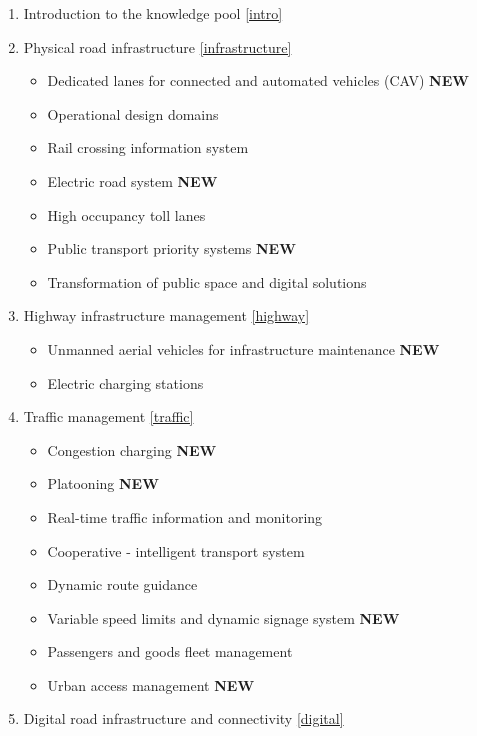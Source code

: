 \documentclass[
]{book}
\providecommand{\tightlist}{%
  \setlength{\itemsep}{0pt}\setlength{\parskip}{0pt}}
\begin{document}
\begin{enumerate}
\def\labelenumi{\arabic{enumi}.}
\tightlist
\item
  Introduction to the knowledge pool \ref{intro}
\item
  Physical road infrastructure \ref{infrastructure}

  \begin{itemize}
  \tightlist
  \item
    Dedicated lanes for connected and automated vehicles (CAV) \textbf{NEW}
  \item
    Operational design domains
  \item
    Rail crossing information system
  \item
    Electric road system \textbf{NEW}
  \item
    High occupancy toll lanes
  \item
    Public transport priority systems \textbf{NEW}
  \item
    Transformation of public space and digital solutions
  \end{itemize}
\item
  Highway infrastructure management \ref{highway}

  \begin{itemize}
  \tightlist
  \item
    Unmanned aerial vehicles for infrastructure maintenance \textbf{NEW}
  \item
    Electric charging stations
  \end{itemize}
\item
  Traffic management \ref{traffic}

  \begin{itemize}
  \tightlist
  \item
    Congestion charging \textbf{NEW}
  \item
    Platooning \textbf{NEW}
  \item
    Real-time traffic information and monitoring
  \item
    Cooperative - intelligent transport system
  \item
    Dynamic route guidance
  \item
    Variable speed limits and dynamic signage system \textbf{NEW}
  \item
    Passengers and goods fleet management
  \item
    Urban access management \textbf{NEW}
  \end{itemize}
\item
  Digital road infrastructure and connectivity \ref{digital}


\end{enumerate}
\end{document}
